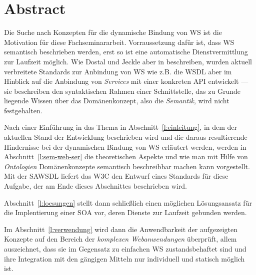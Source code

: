 \section*{Abstract}

Die Suche nach Konzepten für die dynamische Bindung von \acl{WS} ist die Motivation für diese Fachseminararbeit. Vorraussetzung dafür ist, dass \acl{WS} semantisch beschrieben werden, erst so ist eine automatische Dienstvermittlung zur Laufzeit möglich. Wie Dostal und Jeckle aber in \cite[S.55]{xmlspek1} beschreiben, wurden aktuell verbreitete Standards zur Anbindung von \acl{WS} wie z.B. die \acs{WSDL} aber im Hinblick auf die Anbindung von \emph{Services} mit einer konkreten \acs{API} entwickelt --- sie beschreiben den syntaktischen Rahmen einer Schnittstelle, das zu Grunde liegende Wissen über das Domänenkonzept, also die \emph{Semantik}, wird nicht festgehalten. 

Nach einer Einführung in das Thema in Abschnitt~\ref{l:einleitung}, in dem der aktuellen Stand der Entwicklung beschrieben wird und die daraus resultierende Hindernisse bei der dynamischen Bindung von \acl{WS} erläutert werden, werden in Abschnitt~\ref{l:sem-web-ser} die theoretischen Aspekte und wie man mit Hilfe von \emph{Ontologien} Domänenkonzepte semantisch beschreibbar machen kann vorgestellt. Mit der \acs{SAWSDL} liefert das \acs{W3C} den Entwurf eines Standards für diese Aufgabe, der am Ende dieses Abschnittes beschrieben wird.

Abschnitt~\ref{l:loesungen} stellt dann schließlich einen möglichen Lösungsansatz für die Implentierung einer \acs{SOA} vor, deren Dienste zur Laufzeit gebunden werden.

Im Abschnitt~\ref{l:verwendung} wird dann die Anwendbarkeit der aufgezeigten Konzepte auf den Bereich der \emph{komplexen Webanwendungen} überprüft, allem auszeichnet, dass sie im Gegensatz zu einfachen \acl{WS} zustandsbehaftet sind und ihre Integration mit den gängigen Mitteln nur individuell und statisch möglich ist.